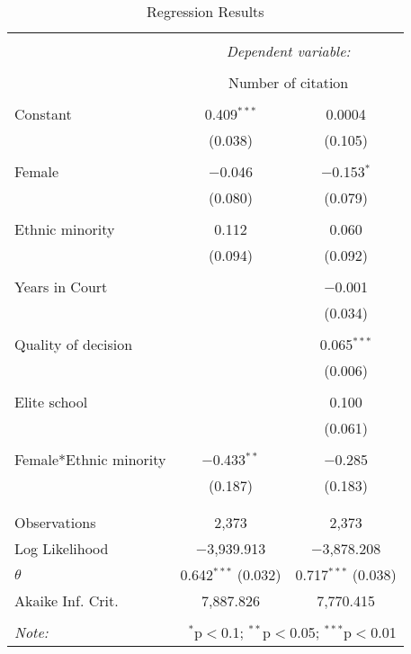 
\begin{table}[!htbp] \centering 
  \caption{Regression Results} 
  \label{} 
\begin{tabular}{@{\extracolsep{5pt}}lcc} 
\\[-1.8ex]\hline 
\hline \\[-1.8ex] 
 & \multicolumn{2}{c}{\textit{Dependent variable:}} \\ 
\cline{2-3} 
\\[-1.8ex] & \multicolumn{2}{c}{Number of citation} \\ 
\hline \\[-1.8ex] 
 Constant & 0.409$^{***}$ & 0.0004 \\ 
  & (0.038) & (0.105) \\ 
  & & \\ 
 Female & $-$0.046 & $-$0.153$^{*}$ \\ 
  & (0.080) & (0.079) \\ 
  & & \\ 
 Ethnic minority & 0.112 & 0.060 \\ 
  & (0.094) & (0.092) \\ 
  & & \\ 
 Years in Court &  & $-$0.001 \\ 
  &  & (0.034) \\ 
  & & \\ 
 Quality of decision &  & 0.065$^{***}$ \\ 
  &  & (0.006) \\ 
  & & \\ 
 Elite school &  & 0.100 \\ 
  &  & (0.061) \\ 
  & & \\ 
 Female*Ethnic minority & $-$0.433$^{**}$ & $-$0.285 \\ 
  & (0.187) & (0.183) \\ 
  & & \\ 
\hline \\[-1.8ex] 
Observations & 2,373 & 2,373 \\ 
Log Likelihood & $-$3,939.913 & $-$3,878.208 \\ 
$\theta$ & 0.642$^{***}$  (0.032) & 0.717$^{***}$  (0.038) \\ 
Akaike Inf. Crit. & 7,887.826 & 7,770.415 \\ 
\hline 
\hline \\[-1.8ex] 
\textit{Note:}  & \multicolumn{2}{r}{$^{*}$p$<$0.1; $^{**}$p$<$0.05; $^{***}$p$<$0.01} \\ 
\end{tabular} 
\end{table} 
